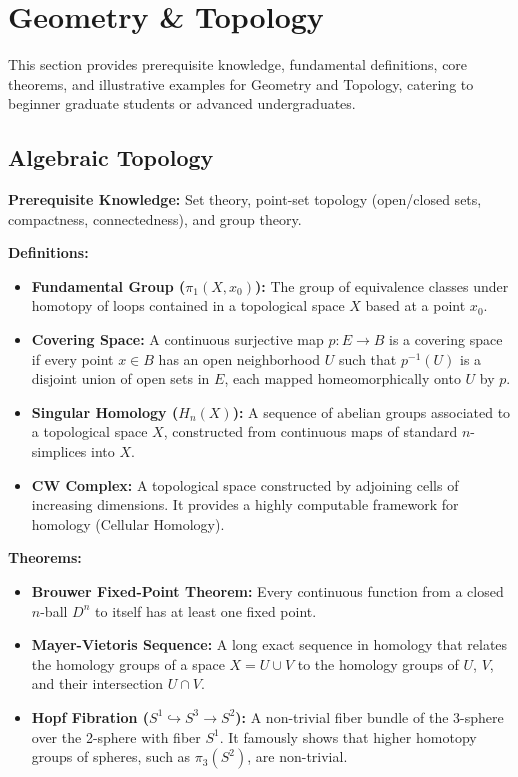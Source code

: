 \chapter{Geometry \& Topology}

This section provides prerequisite knowledge, fundamental definitions, core theorems, and illustrative examples for Geometry and Topology, catering to beginner graduate students or advanced undergraduates.

\section{Algebraic Topology}
\textbf{Prerequisite Knowledge:} Set theory, point-set topology (open/closed sets, compactness, connectedness), and group theory.

\textbf{Definitions:}
\begin{itemize}
    \item \textbf{Fundamental Group ($\pi_1(X, x_0)$):} The group of equivalence classes under homotopy of loops contained in a topological space $X$ based at a point $x_0$.
    \item \textbf{Covering Space:} A continuous surjective map $p: E \to B$ is a covering space if every point $x \in B$ has an open neighborhood $U$ such that $p^{-1}(U)$ is a disjoint union of open sets in $E$, each mapped homeomorphically onto $U$ by $p$.
    \item \textbf{Singular Homology ($H_n(X)$):} A sequence of abelian groups associated to a topological space $X$, constructed from continuous maps of standard $n$-simplices into $X$.
    \item \textbf{CW Complex:} A topological space constructed by adjoining cells of increasing dimensions. It provides a highly computable framework for homology (Cellular Homology).
\end{itemize}

\textbf{Theorems:}
\begin{itemize}
    \item \textbf{Brouwer Fixed-Point Theorem:} Every continuous function from a closed $n$-ball $D^n$ to itself has at least one fixed point.
    \item \textbf{Mayer-Vietoris Sequence:} A long exact sequence in homology that relates the homology groups of a space $X = U \cup V$ to the homology groups of $U$, $V$, and their intersection $U \cap V$.
    \item \textbf{Hopf Fibration ($S^1 \hookrightarrow S^3 \to S^2$):} A non-trivial fiber bundle of the 3-sphere over the 2-sphere with fiber $S^1$. It famously shows that higher homotopy groups of spheres, such as $\pi_3(S^2)$, are non-trivial.
\end{itemize}

